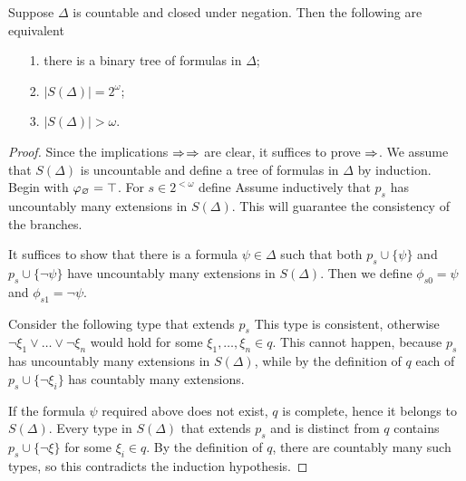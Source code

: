 \documentclass[creche.tex]{subfiles}
\begin{document}
\begin{lemma}\label{lem_bin_tree}
Suppose $\Delta$ is countable and closed under negation.
Then the following are equivalent\nobreak
\begin{itemize}   
\item[1.] there is a binary tree of formulas in $\Delta$;
\item[2.] $\big|S(\Delta)\big|=2^\omega$;
\item[3.] $\big|S(\Delta)\big|>\omega$.
\end{itemize}
\end{lemma}
\begin{proof}
Since the implications $\Rightarrow$$\Rightarrow$ are clear, it
suffices to prove $\Rightarrow$.
We assume that $S(\Delta)$ is uncountable and define a tree of
formulas in $\Delta$ by induction.
Begin with $\varphi_\varnothing=\top$.
For $s\in 2^{<\omega}$ define
Assume inductively that $p_s$ has uncountably many extensions in $S(\Delta)$.
This will guarantee the consistency of the branches.

It suffices to show that there is a formula $\psi\in\Delta$ such that
both $p_s\cup\{\psi\}$ and $p_s\cup\{\neg\psi\}$ have uncountably many
extensions in $S(\Delta)$.
Then we define $\phi_{s0}=\psi$ and $\phi_{s1}=\neg\psi$.

Consider the following type that extends $p_s$
This type is consistent, otherwise $\neg\xi_1\vee\dots\vee\neg\xi_n$
would hold for some $\xi_1, \ldots, \xi_n \in q$.
This cannot happen, because $p_s$ has uncountably many extensions in
$S(\Delta)$, while by the definition of $q$ each of
$p_s\cup\{\neg\xi_i\}$ has countably many extensions.

If the formula $\psi$ required above does not exist, $q$ is complete,
hence it belongs to $S(\Delta)$.
Every type in $S(\Delta)$ that extends $p_s$ and is distinct from $q$
contains $p_s\cup\{\neg\xi\}$ for some $\xi_i\in q$.
By the definition of $q$, there are countably many such types,
so this contradicts the induction hypothesis.
\end{proof}
\end{document}
